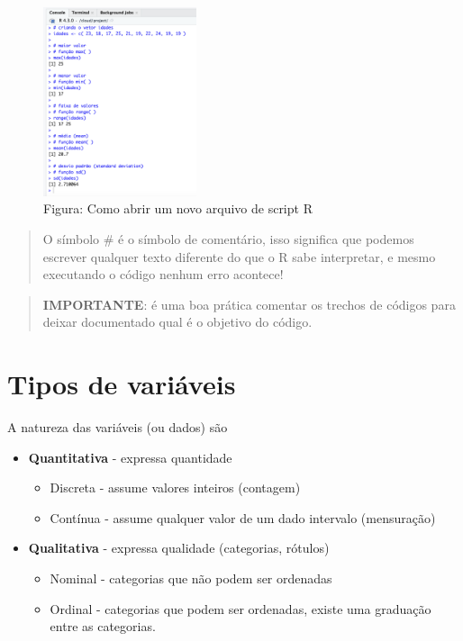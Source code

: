 \documentclass[
]{book}
\begin{document}
\begin{figure}
\centering
\includegraphics[width=0.4\textwidth,height=\textheight]{telaRespostaConsole.png}
\caption{Figura: Como abrir um novo arquivo de script R}
\end{figure}

\begin{quote}
O símbolo \# é o símbolo de comentário, isso significa que podemos escrever qualquer texto diferente do que o R sabe interpretar, e mesmo executando o código nenhum erro acontece!
\end{quote}

\begin{quote}
\textbf{IMPORTANTE}: é uma boa prática comentar os trechos de códigos para deixar documentado qual é o objetivo do código.
\end{quote}

\chapter{Tipos de variáveis}\label{tipos-de-variuxe1veis}

A natureza das variáveis (ou dados) são

\begin{itemize}
\item
  \textbf{Quantitativa} - expressa quantidade

  \begin{itemize}
  \item
    Discreta - assume valores inteiros (contagem)
  \item
    Contínua - assume qualquer valor de um dado intervalo (mensuração)
  \end{itemize}
\item
  \textbf{Qualitativa} - expressa qualidade (categorias, rótulos)

  \begin{itemize}
  \item
    Nominal - categorias que não podem ser ordenadas
  \item
    Ordinal - categorias que podem ser ordenadas, existe uma graduação entre as categorias.
  \end{itemize}
\end{itemize}
\end{document}
